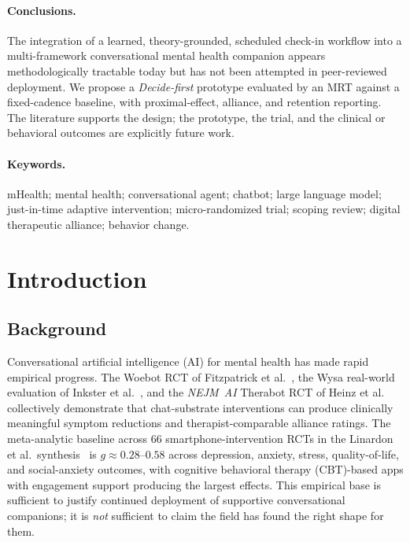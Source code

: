 \documentclass[11pt,a4paper]{article}
\begin{document}
\paragraph{Conclusions.}
The integration of a learned, theory-grounded, scheduled check-in
workflow into a multi-framework conversational mental health
companion appears methodologically tractable today but has not been
attempted in peer-reviewed deployment. We propose a
\emph{Decide-first} prototype evaluated by an MRT against a
fixed-cadence baseline, with proximal-effect, alliance, and
retention reporting. The literature supports the design; the
prototype, the trial, and the clinical or behavioral outcomes are
explicitly future work.

\paragraph{Keywords.}
mHealth; mental health; conversational agent; chatbot; large language
model; just-in-time adaptive intervention; micro-randomized trial;
scoping review; digital therapeutic alliance; behavior change.

\section{Introduction}\label{sec:introduction}

\subsection{Background}\label{sec:bg}

Conversational artificial intelligence (AI) for mental health has
made rapid empirical progress. The Woebot RCT of Fitzpatrick et
al.~\cite{Fitzpatrick2017Woebot}, the Wysa real-world evaluation of
Inkster et al.~\cite{Inkster2018Wysa}, and the
\textit{NEJM~AI} Therabot RCT of Heinz et
al.~\cite{Heinz2025TherabotRCT} collectively demonstrate that
chat-substrate interventions can produce clinically meaningful
symptom reductions and therapist-comparable alliance ratings. The
meta-analytic baseline across 66 smartphone-intervention RCTs in the
Linardon et al.\ synthesis~\cite{Linardon2019Meta} is
$g\!\approx\!0.28\text{--}0.58$ across depression, anxiety, stress,
quality-of-life, and social-anxiety outcomes, with cognitive
behavioral therapy (CBT)-based apps with engagement support producing
the largest effects. This empirical base is sufficient to justify
continued deployment of supportive conversational companions; it is
\emph{not} sufficient to claim the field has found the right shape
for them.
\end{document}
